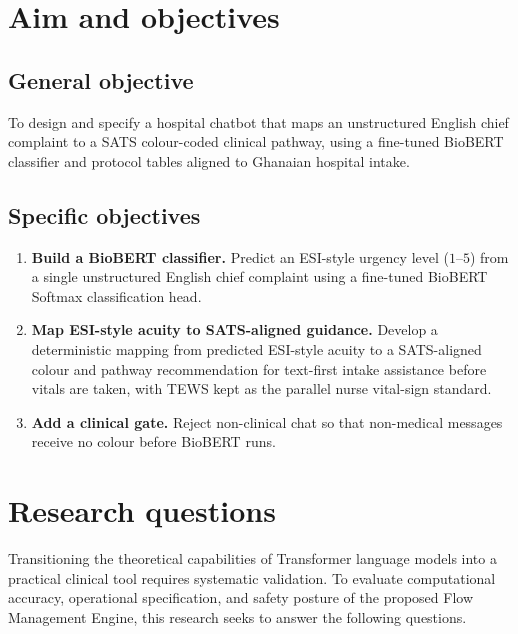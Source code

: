 \section{Aim and objectives}

\subsection{General objective}

To design and specify a hospital chatbot that maps an unstructured English chief complaint to a SATS colour-coded clinical pathway, using a fine-tuned BioBERT classifier and protocol tables aligned to Ghanaian hospital intake.

\subsection{Specific objectives}

\begin{enumerate}
\item \textbf{Build a BioBERT classifier.} Predict an ESI-style urgency level (\(1\)--\(5\)) from a single unstructured English chief complaint using a fine-tuned BioBERT Softmax classification head.
\item \textbf{Map ESI-style acuity to SATS-aligned guidance.} Develop a deterministic mapping from predicted ESI-style acuity to a SATS-aligned colour and pathway recommendation for text-first intake assistance before vitals are taken, with TEWS kept as the parallel nurse vital-sign standard.
\item \textbf{Add a clinical gate.} Reject non-clinical chat so that non-medical messages receive no colour before BioBERT runs.
\end{enumerate}

\section{Research questions}
\label{sec:rqs}

Transitioning the theoretical capabilities of Transformer language models into a practical clinical tool requires systematic validation. To evaluate computational accuracy, operational specification, and safety posture of the proposed Flow Management Engine, this research seeks to answer the following questions.

